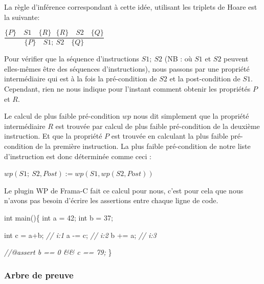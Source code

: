 \documentclass[12pt,francais,]{scrbook}
\newenvironment{Shaded}{}{}
\newcommand{\DataTypeTok}[1]{\textcolor[rgb]{0.56,0.13,0.00}{{#1}}}
\newcommand{\DecValTok}[1]{\textcolor[rgb]{0.25,0.63,0.44}{{#1}}}
\newcommand{\CommentTok}[1]{\textcolor[rgb]{0.38,0.63,0.69}{\textit{{#1}}}}
\newcommand{\NormalTok}[1]{{#1}}
\begin{document}
La règle d'inférence correspondant à cette idée, utilisant les triplets
de Hoare est la suivante:

\begin{center}
\(\dfrac{\{P\}\quad S1 \quad \{R\} \ \ \ \{R\}\quad S2 \quad \{Q\}}{\{P\}\quad S1 ;\ S2 \quad \{Q\}}\)
\end{center}

Pour vérifier que la séquence d'instructions \(S1;\ S2\) (NB : où \(S1\)
et \(S2\) peuvent elles-mêmes être des séquences d'instructions), nous
passons par une propriété intermédiaire qui est à la fois la
pré-condition de \(S2\) et la post-condition de \(S1\). Cependant, rien
ne nous indique pour l'instant comment obtenir les propriétés \(P\) et
\(R\).

Le calcul de plus faible pré-condition \(wp\) nous dit simplement que la
propriété intermédiaire \(R\) est trouvée par calcul de plus faible
pré-condition de la deuxième instruction. Et que la propriété \(P\) est
trouvée en calculant la plus faible pré-condition de la première
instruction. La plus faible pré-condition de notre liste d'instruction
est donc déterminée comme ceci :

\begin{center} \(wp(S1;\ S2 , Post) := wp(S1, wp(S2, Post) )\)
\end{center}

Le plugin WP de Frama-C fait ce calcul pour nous, c'est pour cela que
nous n'avons pas besoin d'écrire les assertions entre chaque ligne de
code.

\begin{footnotesize}\begin{Shaded}
\begin{Highlighting}[]
\DataTypeTok{int} \NormalTok{main()\{}
  \DataTypeTok{int} \NormalTok{a = }\DecValTok{42}\NormalTok{;}
  \DataTypeTok{int} \NormalTok{b = }\DecValTok{37}\NormalTok{;}

  \DataTypeTok{int} \NormalTok{c = a+b; }\CommentTok{// i:1}
  \NormalTok{a -= c;      }\CommentTok{// i:2}
  \NormalTok{b += a;      }\CommentTok{// i:3}

  \CommentTok{//@assert b == 0 && c == 79;}
\NormalTok{\}}
\end{Highlighting}
\end{Shaded}\end{footnotesize}

\subsubsection{Arbre de preuve}\label{arbre-de-preuve}
\end{document}
